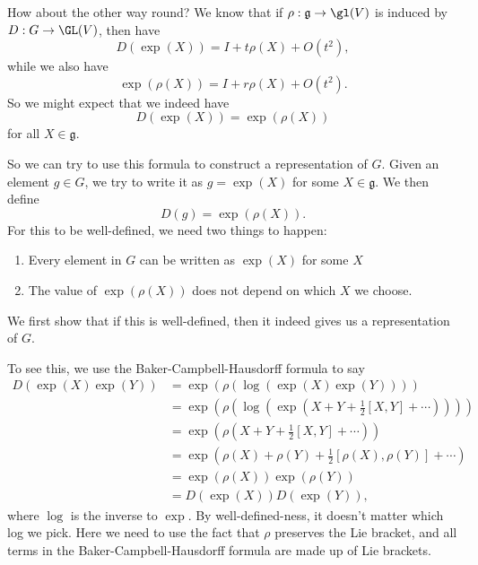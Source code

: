 \documentclass[a4paper]{article}
\begin{document}
How about the other way round? We know that if $\rho: \mathfrak{g} \to \gl(V)$ is induced by $D: G \to \GL(V)$, then have
\[
  D(\exp(X)) = I + t \rho(X) + O(t^2),
\]
while we also have
\[
  \exp(\rho(X)) = I + r \rho(X) + O(t^2).
\]
So we might expect that we indeed have
\[
  D(\exp(X)) = \exp(\rho(X))
\]
for all $X \in \mathfrak{g}$.

So we can try to use this formula to construct a representation of $G$. Given an element $g \in G$, we try to write it as $g = \exp(X)$ for some $X \in \mathfrak{g}$. We then define
\[
  D(g) = \exp(\rho(X)).
\]
For this to be well-defined, we need two things to happen:
\begin{enumerate}
  \item Every element in $G$ can be written as $\exp(X)$ for some $X$
  \item The value of $\exp(\rho(X))$ does not depend on which $X$ we choose.
\end{enumerate}
We first show that if this is well-defined, then it indeed gives us a representation of $G$.

To see this, we use the Baker-Campbell-Hausdorff formula to say
\begin{align*}
  D(\exp(X) \exp(Y)) &= \exp(\rho(\log(\exp(X)\exp(Y))))\\
  &= \exp\left(\rho\left(\log\left(\exp\left(X + Y + \frac{1}{2}[X, Y] + \cdots\right)\right)\right)\right)\\
  &= \exp\left(\rho\left(X + Y + \frac{1}{2}[X, Y] + \cdots\right)\right)\\
  &= \exp\left(\rho(X) + \rho(Y) + \frac{1}{2}[\rho(X), \rho(Y)] + \cdots\right)\\
  &= \exp(\rho(X))\exp(\rho(Y))\\
  &= D(\exp(X)) D(\exp(Y)),
\end{align*}
where $\log$ is the inverse to $\exp$. By well-defined-ness, it doesn't matter which log we pick. Here we need to use the fact that $\rho$ preserves the Lie bracket, and all terms in the Baker-Campbell-Hausdorff formula are made up of Lie brackets.
\end{document}
